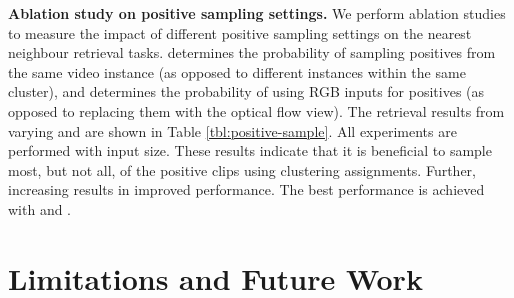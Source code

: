 \documentclass[10pt,twocolumn,letterpaper]{article}
\begin{document}
\textbf{Ablation study on positive sampling settings.} We perform ablation studies to measure the impact of different positive sampling settings on the nearest neighbour retrieval tasks.  determines the probability of sampling positives from the same video instance (as opposed to different instances within the same cluster), and  determines the probability of using RGB inputs for positives (as opposed to replacing them with the optical flow view). The retrieval results from varying  and  are shown in Table \ref{tbl:positive-sample}. All experiments are performed with  input size. These results indicate that it is beneficial to sample most, but not all, of the positive clips using clustering assignments. Further, increasing  results in improved performance. The best performance is achieved with  and . 
\begin{table}[h!]
    \vspace{-0.2cm}

  \caption{\textbf{Ablation study on the impact of \boldmath and \boldmath} on video retrieval (after pretraining on UCF101). The ablations on  are done using RGB views only. }\vspace{-0.2cm}

  \label{tbl:positive-sample}
  \centering
  \vspace{-0.5cm}
\end{table}
\section{Limitations and Future Work}
\end{document}
